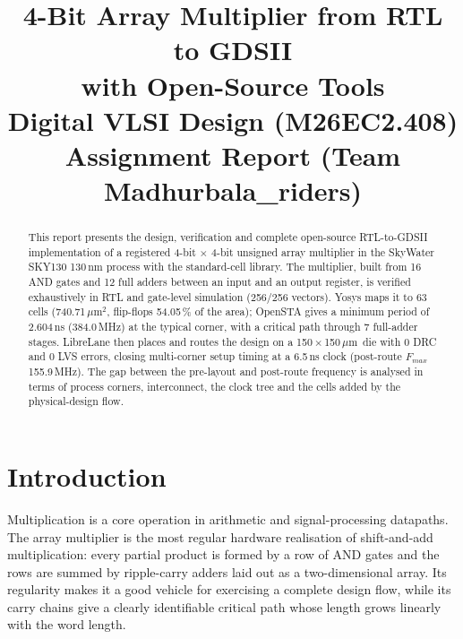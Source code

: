 \documentclass[conference]{IEEEtran}
\newcommand{\um}{\,$\mu$m}
\newcommand{\umsq}{\,$\mu$m$^2$}
\newcommand{\cell}[1]{\texttt{\detokenize{#1}}}
\begin{document}
\title{4-Bit Array Multiplier from RTL to GDSII\\ with Open-Source Tools\\
\large Digital VLSI Design (M26EC2.408) Assignment Report (Team Madhurbala\_riders)}

\author{
\and
{}
}

\maketitle

\begin{abstract}
This report presents the design, verification and complete open-source RTL-to-GDSII implementation of a
registered 4-bit $\times$ 4-bit unsigned array multiplier in the SkyWater SKY130 130\,nm process with the
\cell{sky130_fd_sc_hd} standard-cell library. The multiplier, built from 16 AND gates and 12 full adders between
an input and an output register, is verified exhaustively in RTL and gate-level simulation (256/256 vectors).
Yosys maps it to 63 cells (740.71\umsq, flip-flops 54.05\,\% of the area); OpenSTA gives a minimum period of
2.604\,ns (384.0\,MHz) at the typical corner, with a critical path through 7 full-adder stages. LibreLane
then places and routes the design on a 150\,$\times$\,150\um\ die with 0 DRC and 0 LVS errors, closing
multi-corner setup timing at a 6.5\,ns clock (post-route $F_{max}$ 155.9\,MHz). The gap between the
pre-layout and post-route frequency is analysed in terms of process corners, interconnect, the clock tree
and the cells added by the physical-design flow.
\end{abstract}

\section{Introduction}
Multiplication is a core operation in arithmetic and signal-processing datapaths. The array multiplier is
the most regular hardware realisation of shift-and-add multiplication: every partial product is formed by
a row of AND gates and the rows are summed by ripple-carry adders laid out as a two-dimensional array. Its
regularity makes it a good vehicle for exercising a complete design flow, while its carry chains give a
clearly identifiable critical path whose length grows linearly with the word length.
\end{document}

